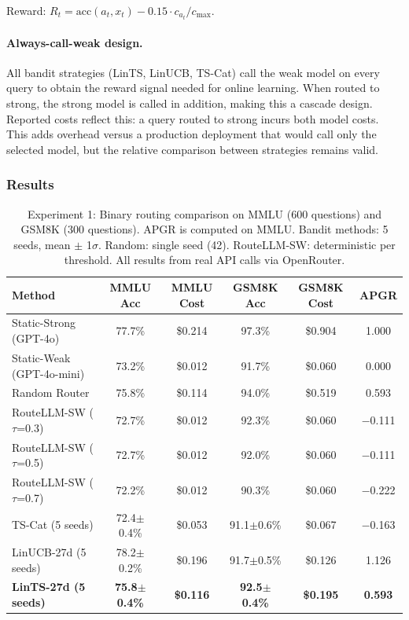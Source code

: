 \documentclass[11pt]{article}
\begin{document}
Reward: $R_t = \text{acc}(a_t, x_t) - 0.15 \cdot c_{a_t} / c_{\max}$.

\paragraph{Always-call-weak design.} All bandit strategies (LinTS, LinUCB, TS-Cat) call the weak model on every query to obtain the reward signal needed for online learning. When routed to strong, the strong model is called in addition, making this a cascade design. Reported costs reflect this: a query routed to strong incurs both model costs. This adds overhead versus a production deployment that would call only the selected model, but the relative comparison between strategies remains valid.

\subsubsection{Results}

\begin{table}[h]
\centering
\caption{Experiment 1: Binary routing comparison on MMLU (600 questions) and GSM8K (300 questions). APGR is computed on MMLU. Bandit methods: 5 seeds, mean $\pm$ 1$\sigma$. Random: single seed (42). RouteLLM-SW: deterministic per threshold. All results from real API calls via OpenRouter.}
\label{tab:exp1}
\begin{tabular}{@{}lccccc@{}}
\toprule
\textbf{Method} & \textbf{MMLU Acc} & \textbf{MMLU Cost} & \textbf{GSM8K Acc} & \textbf{GSM8K Cost} & \textbf{APGR} \\
\midrule
Static-Strong (GPT-4o)    & 77.7\%          & \$0.214  & 97.3\%          & \$0.904  & 1.000 \\
Static-Weak (GPT-4o-mini) & 73.2\%          & \$0.012  & 91.7\%          & \$0.060  & 0.000 \\
Random Router             & 75.8\%          & \$0.114  & 94.0\%          & \$0.519  & 0.593 \\
\midrule
RouteLLM-SW ($\tau$=0.3)  & 72.7\%          & \$0.012  & 92.3\%          & \$0.060  & $-$0.111 \\
RouteLLM-SW ($\tau$=0.5)  & 72.7\%          & \$0.012  & 92.0\%          & \$0.060  & $-$0.111 \\
RouteLLM-SW ($\tau$=0.7)  & 72.2\%          & \$0.012  & 90.3\%          & \$0.060  & $-$0.222 \\
\midrule
TS-Cat (5 seeds)          & 72.4$\pm$0.4\%  & \$0.053  & 91.1$\pm$0.6\%  & \$0.067  & $-$0.163 \\
LinUCB-27d (5 seeds)      & 78.2$\pm$0.2\%  & \$0.196  & 91.7$\pm$0.5\%  & \$0.126  & 1.126 \\
\textbf{LinTS-27d (5 seeds)} & \textbf{75.8$\pm$0.4\%} & \textbf{\$0.116} & \textbf{92.5$\pm$0.4\%} & \textbf{\$0.195} & \textbf{0.593} \\
\bottomrule
\end{tabular}
\end{table}
\end{document}

